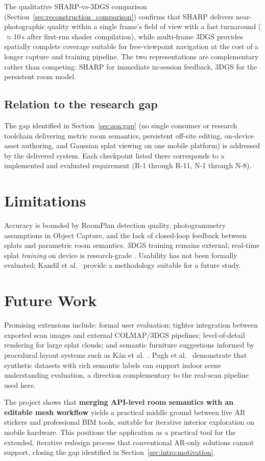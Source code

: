 The qualitative SHARP-vs-3DGS comparison (Section~\ref{sec:reconstruction_comparison}) confirms that SHARP delivers near-photographic quality within a single frame's field of view with a fast turnaround ($\approx$10\,s after first-run shader compilation), while multi-frame 3DGS provides spatially complete coverage suitable for free-viewpoint navigation at the cost of a longer capture and training pipeline. The two representations are complementary rather than competing: SHARP for immediate in-session feedback, 3DGS for the persistent room model.

\subsection{Relation to the research gap}

The gap identified in Section~\ref{sec:soa:gap} (no single consumer or research toolchain delivering metric room semantics, persistent off-site editing, on-device asset authoring, and Gaussian splat viewing on one mobile platform) is addressed by the delivered system. Each checkpoint listed there corresponds to a implemented and evaluated requirement (R-1 through R-11, N-1 through N-8).

\section{Limitations}

Accuracy is bounded by RoomPlan detection quality, photogrammetry assumptions in Object Capture, and the lack of closed-loop feedback between splats and parametric room semantics. 3DGS training remains external; real-time splat \emph{training} on device is research-grade \cite{Guo26}. Usability has not been formally evaluated; Kandil et al.\ \cite{kandil2021ux} provide a methodology suitable for a future study.

\section{Future Work}

Promising extensions include: formal user evaluation; tighter integration between
exported scan images and external COLMAP/3DGS pipelines; level-of-detail rendering
for large splat clouds; and semantic furniture suggestions informed by procedural
layout systems such as K\'an et al.~\cite{kan2021ar}. Pugh et al.\
\cite{Geo2023} demonstrate that synthetic datasets with rich semantic labels
can support indoor scene understanding evaluation, a direction complementary
to the real-scan pipeline used here.

The project shows that \textbf{merging API-level room semantics with an editable mesh workflow} yields a practical middle ground between live AR stickers and professional BIM tools, suitable for iterative interior exploration on mobile hardware. This positions the application as a practical tool for the extended, iterative redesign process that conventional AR-only solutions cannot support, closing the gap identified in Section~\ref{sec:intro:motivation}.
